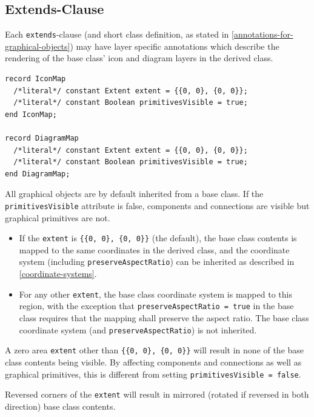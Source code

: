\subsection{Extends-Clause}\label{extends-clause}

Each \lstinline!extends!-clause (and short class definition, as stated in \cref{annotations-for-graphical-objects}) may have layer specific annotations which describe the rendering of the base class' icon and diagram layers in the derived class.

\begin{lstlisting}[language=modelica]
record IconMap
  /*literal*/ constant Extent extent = {{0, 0}, {0, 0}};
  /*literal*/ constant Boolean primitivesVisible = true;
end IconMap;

record DiagramMap
  /*literal*/ constant Extent extent = {{0, 0}, {0, 0}};
  /*literal*/ constant Boolean primitivesVisible = true;
end DiagramMap;
\end{lstlisting}%
All graphical objects are by default inherited from a base class.
If the \lstinline!primitivesVisible! attribute is false, components and connections are visible but graphical primitives are not.

\begin{itemize}
\item
  If the \lstinline!extent! is \lstinline!{{0, 0}, {0, 0}}! (the default), the base class contents is mapped to the same coordinates in the derived class, and the coordinate system (including \lstinline!preserveAspectRatio!) can be inherited as described in \cref{coordinate-systems}.
\item
  For any other \lstinline!extent!, the base class coordinate system is mapped to this region, with the exception that \lstinline!preserveAspectRatio = true! in the base class requires that the mapping shall preserve the aspect ratio.
  The base class coordinate system (and \lstinline!preserveAspectRatio!) is not inherited.
\end{itemize}

\begin{nonnormative}
A zero area \lstinline!extent! other than \lstinline!{{0, 0}, {0, 0}}! will result in none of the base class contents being visible.
By affecting components and connections as well as graphical primitives, this is different from setting \lstinline!primitivesVisible = false!.

Reversed corners of the \lstinline!extent! will result in mirrored (rotated if reversed in both direction) base class contents.
\end{nonnormative}

